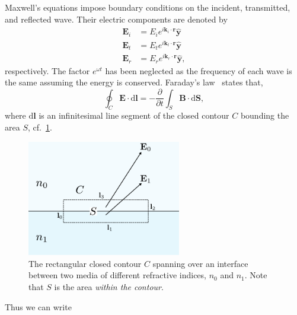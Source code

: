 \documentclass[10pt,twoside, b5paper,pdftex]{report}
\begin{document}
Maxwell's equations impose boundary conditions on the incident, transmitted, and reflected wave. Their electric components  are denoted by
\begin{subequations}\label{grp:Erels}
\begin{align}
\mathbf{E}_{i} &= E_{i} e^{i\mathbf{k}_{i}\cdot\mathbf{r}} \widehat{ {\mathbf y}} \label{eq:Ei} \\
\mathbf{E}_{t} &= E_{t} e^{i\mathbf{k}_{t}\cdot\mathbf{r}} \widehat{ {\mathbf y}} \label{eq:Et} \\
\mathbf{E}_{r} &= E_{r} e^{i\mathbf{k}_{r}\cdot\mathbf{r}} \widehat{ {\mathbf y}} \label{eq:Er} ,
\end{align}
\end{subequations}
%
respectively. The factor $e^{\omega t}$ has been neglected as the frequency of each wave is the same assuming the energy is conserved.  Faraday's law~\cite{POPOVIC} states that, 
\begin{equation}\label{eq:maxwell_1}
\oint_{C} \mathbf{E} \cdot \mbox{d}\mathbf{l} = -\frac{\partial}{\partial t} \int_{S} \mathbf{B} \cdot \mbox{d}\mathbf{S},
\end{equation}
where $\mbox{d}\mathbf{l}$ is an infinitesimal line segment of the closed contour $C$ bounding the area $S$, cf.~\cref{fig:C}. 
\begin{figure}[htbp]
	\begin{center}
		\includegraphics[width=0.6\textwidth]{figures/Contour.pdf}		
	\end{center}
	\caption{The rectangular closed contour $C$ spanning over an interface between two media of different refractive indices, $n_0$ and $n_1$. Note that $S$ is the area {\it within the contour}. \label{fig:C}}
\end{figure}
Thus we can write
\end{document}
